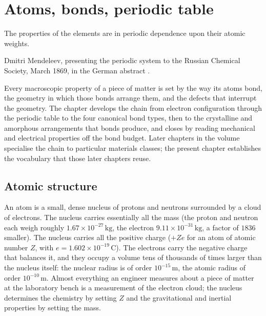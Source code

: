 \chapter{Atoms, bonds, periodic table}
\label{vol05:ch01}

\epigraph{The properties of the elements are in periodic dependence
upon their atomic weights.}{Dmitri Mendeleev, presenting the periodic
system to the Russian Chemical Society, March 1869, in the German
abstract \cite[pp.~405--406]{hist:mendeleev1869}.}


\noindent
Every macroscopic property of a piece of matter is set by the way its
atoms bond, the geometry in which those bonds arrange them, and the
defects that interrupt the geometry. The chapter develops the chain
from electron configuration through the periodic table to the four
canonical bond types, then to the crystalline and amorphous
arrangements that bonds produce, and closes by reading mechanical and
electrical properties off the bond budget. Later chapters in the volume
specialise the chain to particular materials classes; the present
chapter establishes the vocabulary that those later chapters reuse.

\section{Atomic structure}

An atom is a small, dense nucleus of protons and neutrons surrounded
by a cloud of electrons. The nucleus carries essentially all the mass
(the proton and neutron each weigh roughly $1.67 \times 10^{-27}\,
\text{kg}$, the electron $9.11 \times 10^{-31}\,\text{kg}$, a factor of
$1836$ smaller). The nucleus carries all the positive charge ($+Ze$
for an atom of atomic number $Z$, with $e = 1.602 \times 10^{-19}\,
\text{C}$). The electrons carry the negative charge that balances it,
and they occupy a volume tens of thousands of times larger than the
nucleus itself: the nuclear radius is of order $10^{-15}\,\text{m}$,
the atomic radius of order $10^{-10}\,\text{m}$. Almost everything an
engineer measures about a piece of matter at the laboratory bench is a
measurement of the electron cloud; the nucleus determines the
chemistry by setting $Z$ and the gravitational and inertial properties
by setting the mass.


